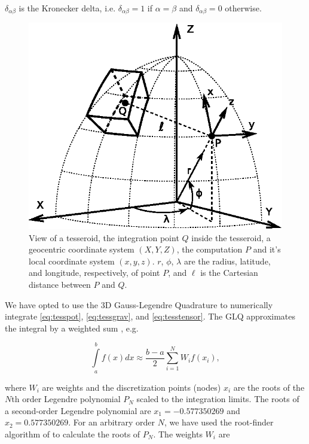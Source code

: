 \documentclass[extra]{gji}
\begin{document}
\noindent
$\delta_{\alpha\beta}$ is the Kronecker delta,
i.e. $\delta_{\alpha\beta}=1$ if $\alpha=\beta$
and $\delta_{\alpha\beta}=0$ otherwise.

\begin{figure}
    \centering
    \includegraphics[width=\columnwidth]{figs/tesseroid}
    \caption{
        View of a tesseroid,
        the integration point $Q$ inside the tesseroid,
        a geocentric coordinate system $(X, Y, Z)$,
        the computation $P$ and it's local coordinate system $(x, y, z)$.
        $r$, $\phi$, $\lambda$ are
        the radius, latitude, and longitude, respectively, of point $P$,
        and $\ell$ is the Cartesian distance between $P$ and $Q$.
    }
    \label{fig:tesseroid}
\end{figure}

We have opted to use
the 3D Gauss-Legendre Quadrature
to numerically integrate
\ref{eq:tesspot},
\ref{eq:tessgrav},
and
\ref{eq:tesstensor}.
The GLQ
approximates the integral by
a weighted sum
\citep{Hildebrand1987},
e.g.

\begin{equation}
    \int\limits_a^b f(x) dx \approx
    \frac{b-a}{2}\sum\limits_{i=1}^N W_i f(x_i),
\end{equation}

\noindent
where
$W_i$ are weights and
the discretization points (nodes) $x_i$
are the roots of the $N$th order Legendre polynomial $P_N$
scaled to the integration limits.
The roots of a second-order Legendre polynomial are
$x_1=-0.577350269$ and $x_2=0.577350269$.
For an arbitrary order $N$,
we have used the root-finder algorithm
of \citet{Barrera-Figueroa2006}
to calculate the roots of $P_N$.
The weights $W_i$ are \citep{Hildebrand1987}
\end{document}
